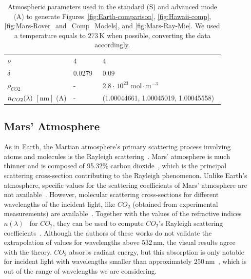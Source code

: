 \documentclass[journal]{vgtc}                %
\begin{document}
\begin{table}[t]
\begin{tabular}{|p{1.5cm}|p{3.2cm} p{3.2cm}|}
    {\small $\nu$} & {\small 4} & {\small 4}\\
    {\small $\delta$} & {\small 0.0279~\cite{Hosek:2012}} & {\small 0.09~\cite{Penndorf:1957}}\\
    {\small $\rho_{CO2}$} & {\small -} & {\small $2.8 \cdot \, 10^{23}$ $\text{mol}\cdot \text{m}^{-3}$~\cite{Ho:2002}}\\
    {\tiny $n_{\tiny CO2}(\lambda)$ $[\text{nm}]$ (A)} & {\small -} & {\tiny (1.00044661, 1.00045019, 1.00045558)~\cite{Ho:2002}}\\
    \hline
  \end{tabular}
  \vspace*{0.2cm}
  \caption{Atmospheric parameters used in the standard (S) and advanced mode (A) to generate Figures~\ref{fig:Earth-comparison}, \ref{fig:Hawaii-comp}, \ref{fig:Mars-Rover_and_Comp_Models}, and \ref{fig:Mars-Ray-Mie}. We used a temperature equals to $273\,\text{K}$ when possible, converting the data accordingly.}
  \label{tab:parameters}
\vspace*{-8mm}
\end{table}
\endgroup

\vspace*{-1.5mm}
\subsection{Mars' Atmosphere}\label{sec:Mars_ATM}

As in Earth, the Martian atmosphere's primary scattering process involving atoms and molecules is the Rayleigh scattering~\cite{Haberle:2017}.
Mars' atmosphere is much thinner and is composed of 95.32\% carbon dioxide~\cite{MarsFact:2018}, which is the principal scattering cross-section contributing to the Rayleigh phenomenon. Unlike Earth's atmosphere, specific values for the scattering coefficients of Mars' atmosphere are not available~\cite{Haberle:2017}. However, molecular scattering cross-sections for different wavelengths of the incident light, like $CO_2$ (obtained from experimental measurements) are available~\cite{Sneep:2005}. Together with the values of the refractive indices $n(\lambda)$~\cite{Bideau:1973} for $CO_2$, they can be used to compute $CO_2$'s Rayleigh scattering coefficients~\cite{Ityaksov:2008}. Although the authors of these works do not validate the extrapolation of values for wavelengths above $532\,\text{nm}$, the visual results agree with the theory. $CO_2$ absorbs radiant energy, but this absorption is only notable for incident light with wavelengths smaller than approximately $250\,\text{nm}$~\cite{Haberle:2017, Ityaksov:2008}, which is out of the range of wavelengths we are considering. 
\end{document}
